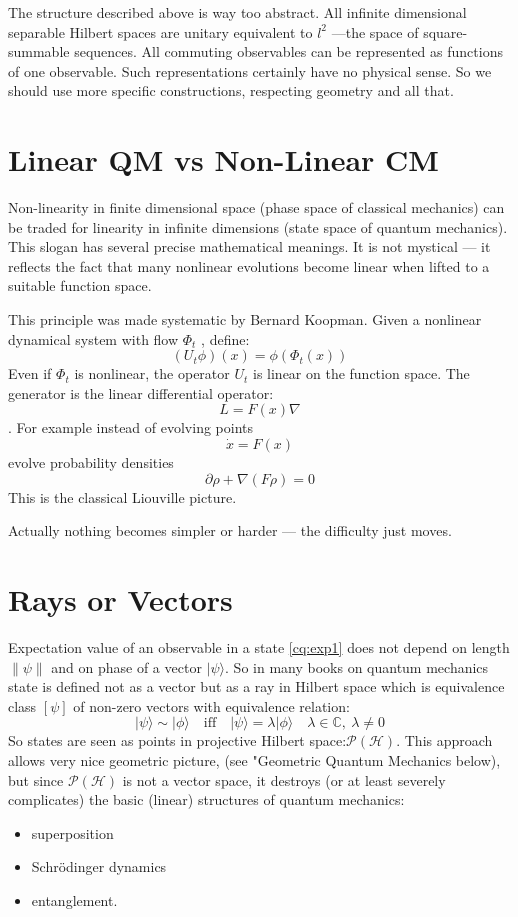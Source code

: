\begin{remark}
    The structure described above is way too abstract. All infinite
    dimensional separable Hilbert spaces are unitary equivalent to
    $ l^2 $ ---the space of square-summable sequences.
    All commuting  observables can be represented as functions of
    one observable. Such representations certainly have no physical
    sense. So we should use more specific constructions, respecting
    geometry and all that.
\end{remark}

\section{Linear QM vs Non-Linear CM}
\label{cq:lqm-ncm}
Non-linearity in finite dimensional space (phase space of classical mechanics)
can be traded for linearity in infinite dimensions (state space of quantum mechanics).
This slogan has several precise mathematical meanings. It is not mystical 
--- it reflects the fact that many nonlinear evolutions become linear 
when lifted to a suitable function space.

This principle was made systematic by
Bernard Koopman.
Given a nonlinear dynamical system with flow $ \Phi_t $
, define: 
\[ (U_t \phi)(x)= \phi(\Phi_t(x)) \]
Even if $ \Phi_t $
is nonlinear, the operator $ U_t $
  is linear on the function space.
The generator is the linear differential operator:
\[L=F(x) \nabla\]. 
For example instead of evolving points \[ \dot x=F(x) \]
evolve probability densities \[ \partial \rho+\nabla (F \rho)=0 \]
This is the classical Liouville picture.

Actually  nothing becomes simpler or harder --- the difficulty just moves.

\section{Rays or Vectors}
\label{cq:rorv}

Expectation value of an observable in a state \eqref{cq:exp1} does not
depend on length $ \|{\psi}\|  $ and on phase of a vector $ |{\psi}\rangle $.
So in many books on quantum mechanics state is defined not as a vector but
as a ray in Hilbert space which is  equivalence class $ [\psi] $ of 
non-zero vectors with equivalence relation:
\begin{equation}
   \label {cq:eqvrel}
|{\psi}\rangle \sim |{\phi}\rangle \quad 
    \text{iff} \quad |{\psi}\rangle = 
    \lambda |{\phi}\rangle \quad \lambda \in \mathbb{C}, \  \lambda \neq 0
\end{equation}
So states are seen as points in  projective Hilbert space:$\mathcal{P}(\mathcal{H})$.
This approach allows very nice geometric picture,
(see "Geometric Quantum Mechanics below), but since $\mathcal{P}(\mathcal{H})$
is not a vector space, it destroys (or at least severely complicates) the
basic (linear) structures of quantum mechanics:
\begin{itemize}
\item superposition
\item Schr\"odinger dynamics
\item entanglement.
\end{itemize}

